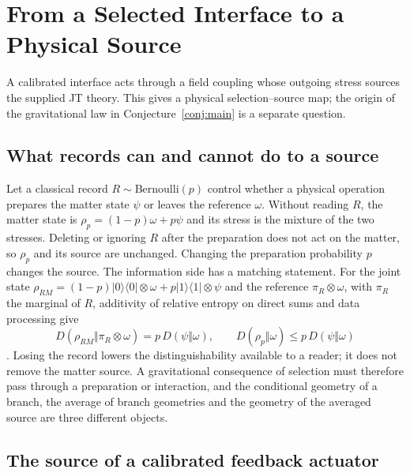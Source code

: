 \documentclass[12pt,a4paper]{article}
\begin{document}
\section{From a Selected Interface to a Physical Source}
\label{sec:source}

A calibrated interface acts through a field coupling whose outgoing stress
sources the supplied JT theory. This gives a physical selection--source map;
the origin of the gravitational law in Conjecture~\ref{conj:main} is a
separate question.

\subsection{What records can and cannot do to a source}
\label{sec:records}

Let a classical record $R\sim\mathrm{Bernoulli}(p)$ control whether a physical operation prepares the matter state $\psi$ or leaves the reference $\omega$. Without reading $R$, the matter state is $\rho_p=(1-p)\omega+p\psi$ and its stress is the mixture of the two stresses. Deleting or ignoring $R$ after the preparation does not act on the matter, so $\rho_p$ and its source are unchanged. Changing the preparation probability $p$ changes the source. The information side has a matching statement. For the joint state $\rho_{RM}=(1-p)|0\rangle\langle0|\otimes\omega+p|1\rangle\langle1|\otimes\psi$ and the reference $\pi_R\otimes\omega$, with $\pi_R$ the marginal of $R$, additivity of relative entropy on direct sums and data processing give
\begin{equation}
D(\rho_{RM}\Vert\pi_R\otimes\omega)=p\,D(\psi\Vert\omega),\qquad D(\rho_p\Vert\omega)\le p\,D(\psi\Vert\omega)
\end{equation}
\cite{OhyaPetz1993}. Losing the record lowers the distinguishability available to a reader; it does not remove the matter source. A gravitational consequence of selection must therefore pass through a preparation or interaction, and the conditional geometry of a branch, the average of branch geometries and the geometry of the averaged source are three different objects.

\subsection{The source of a calibrated feedback actuator}
\label{sec:actuator-source}
\end{document}
